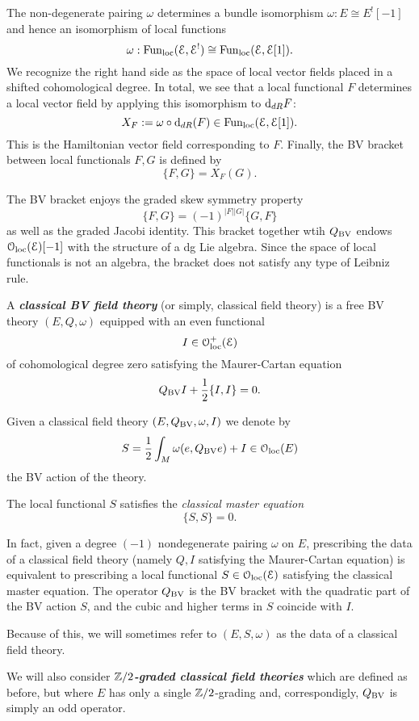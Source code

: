 \documentclass[10pt, oneside]{article}
\newcommand{\defterm}[1]{\textbf{\emph{#1}}}
\begin{document}
The non-degenerate pairing $\omega$ determines a bundle isomorphism $\omega : E \cong E^! [-1]$ and hence an isomorphism of local functions
\[
\omega : {\rm Fun}_{\rm loc}(\mathcal E, \mathcal E^!) \cong {\rm Fun}_{\rm loc}(\mathcal E, \mathcal E[1]) .
\]
We recognize the right hand side as the space of local vector fields placed in a shifted cohomological degree.
In total, we see that a local functional $F$ determines a local vector field by applying this isomorphism to ${\rm d}_{dR}F$:
\[
X_F := \omega \circ {\rm d}_{dR} (F) \in  {\rm Fun}_{\rm loc}(\mathcal E, \mathcal E[1])  .
\]
This is the Hamiltonian vector field corresponding to $F$. 
Finally, the BV bracket between local functionals $F, G$ is defined by
\[
\{F, G\} = X_F (G) .
\]

The BV bracket enjoys the graded skew symmetry property
\[
\{F, G\} = (-1)^{|F| |G|} \{G, F\}
\]
as well as the graded Jacobi identity.
This bracket together wtih $Q_{\mathrm{BV}}$ endows $\mathcal{O}_{\rm loc}(\mathcal E)[-1]$ with the structure of a dg Lie algebra. 
Since the space of local functionals is not an algebra, the bracket does not satisfy any type of Leibniz rule. 


\begin{definition}
A \defterm{classical BV field theory} (or simply, classical field theory) is a free BV theory $(E, Q, \omega)$ equipped with an even functional
\[I \in \mathcal{O}_{\rm loc}^+(\mathcal E)\]
of cohomological degree zero satisfying the Maurer-Cartan equation
\[Q_{\mathrm{BV}} I + \frac{1}{2} \{I,I\} = 0 .\]
\end{definition}

Given a classical field theory $(E, Q_{\mathrm{BV}}, \omega, I)$ we denote by
\[S = \frac{1}{2} \int_M \omega(e, Q_{\mathrm{BV}} e) + I\in \mathcal{O}_{\rm loc}(E)\]
the BV action of the theory.

The local functional $S$ satisfies the {\em classical master equation} \[\{S, S\} = 0.\] 

In fact, given a degree $(-1)$ nondegenerate pairing $\omega$ on $E$, prescribing the data of a classical field theory (namely $Q, I$ satisfying the Maurer-Cartan equation) is equivalent to prescribing a local functional $S \in \mathcal{O}_{\rm loc}(\mathcal E)$ satisfying the classical master equation.
The operator $Q_{\mathrm{BV}}$ is the BV bracket with the quadratic part of the BV action $S$, and the cubic and higher terms in $S$ coincide with $I$.

Because of this, we will sometimes refer to $(E, S, \omega)$ as the data of a classical field theory.

\begin{remark}
We will also consider \defterm{$\mathbb Z/2$-graded classical field theories} which are defined as before, but where $E$ has only a single $\mathbb Z/2$-grading and, correspondigly, $Q_{\mathrm{BV}}$ is simply an odd operator.
\end{remark}
\end{document}
